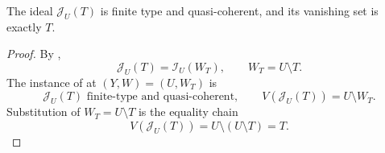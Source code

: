 \begin{lemma}
  \label{lemma:nagata-constructible-closed-support}

  The ideal $\mathcal J_U(T)$ is finite type and quasi-coherent, and its
  vanishing set is exactly $T$.
\end{lemma}

\begin{proof}
  By ,
  \[
    \mathcal J_U(T)=\mathcal I_U(W_T),
    \qquad W_T=U\setminus T.
  \]
  The instance of  at
  $(Y,W)=(U,W_T)$ is
  \[
    \mathcal J_U(T)\text{ finite-type and quasi-coherent},
    \qquad
    V(\mathcal J_U(T))=U\setminus W_T.
  \]
  Substitution of $W_T=U\setminus T$ is the equality chain
  \[
    V(\mathcal J_U(T))
      =U\setminus(U\setminus T)=T.
  \]
\end{proof}


